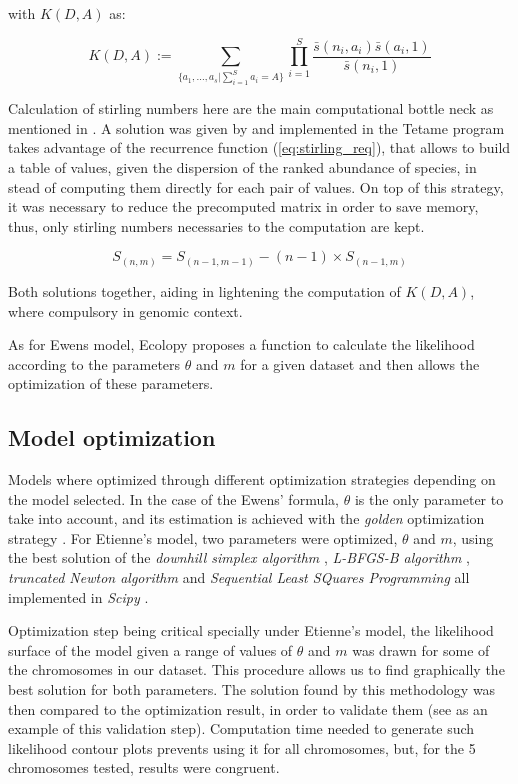 with $K(D,A)$ as:

\begin{equation} \label{eq:kda}
K(D,A) := \sum_{\{a_1,\ldots,a_s|\sum_{i=1}^Sa_i=A\}}\prod_{i=1}^S\frac{\bar{s}(n_i,a_i)\bar{s}(a_i,1)}{\bar{s}(n_i,1)}
\end{equation}

Calculation of stirling numbers here are the main computational bottle neck as mentioned in \cite{Etienne2005}. A solution was given by \cite{Jabot2008} and implemented in the Tetame program takes advantage of the recurrence function (\ref{eq:stirling_req}), that allows to build a table of values, given the dispersion of the ranked abundance of species, in stead of computing them directly for each pair of values. On top of this strategy, it was necessary to reduce the precomputed matrix in order to save memory, thus, only stirling numbers necessaries to the computation are kept.

\begin{equation} \label{eq:stirling_req}
S_{(n,m)} = S_{(n-1, m-1)} - (n-1) \times S_{(n-1, m)}
\end{equation}

Both solutions together, aiding in lightening the computation of $K(D,A)$, where compulsory in genomic context.

As for Ewens model, Ecolopy proposes a function to calculate the likelihood according to the parameters $\theta$ and $m$ for a given dataset and then allows the optimization of these parameters.

\subsection{Model optimization}
\label{sec:model-optimization}

Models where optimized through different optimization strategies depending on the model selected. In the case of the Ewens' formula, $\theta$ is the only parameter to take into account, and its estimation is achieved with the \textit{golden} optimization strategy \cite{Jones2001}. For Etienne's model, two parameters were optimized, $\theta$ and $m$, using the best solution of the \textit{downhill simplex algorithm} \cite{Nelder1965}, \textit{L-BFGS-B algorithm} \cite{Byrd1995}, \textit{truncated Newton algorithm} \cite{Nash1984} and \textit{Sequential Least SQuares Programming} all implemented in \textit{Scipy} \cite{Jones2001}.

Optimization step being critical specially under Etienne's model, the likelihood surface of the model given a range of values of $\theta$ and $m$ was drawn for some of the chromosomes in our dataset. This procedure allows us to find graphically the best solution for both parameters. The solution found by this methodology was then compared to the optimization result, in order to validate them (see  as an example of this validation step). Computation time needed to generate such likelihood contour plots prevents using it for all chromosomes, but, for the 5 chromosomes tested, results were congruent.

